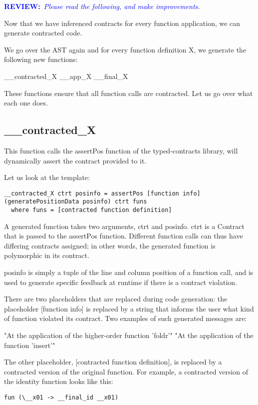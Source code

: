 \documentclass[10pt,a4paper]{article}
\newcommand{\annotate}[3]{
	\begin{scriptsize}
	\textcolor{#1}{\textbf{#2}~\textit{#3}}
	\end{scriptsize}\newline}
\newcommand{\review}{\annotate{blue} {REVIEW:} {Please read the following, and make improvements. \newline}}
\begin{document}
\review

Now that we have inferenced contracts for every function application, we can generate contracted code.

We go over the AST again and for every function definition X, we generate the following new functions:

\_\_contracted\_X
\_\_app\_X
\_\_final\_X

These functions ensure that all function calls are contracted. Let us go over what each one does.

\subsection{\_\_contracted\_X}
This function calls the assertPos function of the typed-contracts library, will dynamically assert the contract provided to it.


Let us look at the template:

\begin{lstlisting}
__contracted_X ctrt posinfo = assertPos [function info] (generatePositionData posinfo) ctrt funs
  where funs = [contracted function definition]
\end{lstlisting}

A generated function takes two arguments, ctrt and posinfo.
ctrt is a Contract that is passed to the assertPos function. 
Different function calls can thus have differing contracts assigned;
in other words, the generated function is polymorphic in its contract.

posinfo is simply a tuple of the line and column position of a function call, and is used to generate specific feedback at runtime if there is a contract violation.

There are two placeholders that are replaced during code generation:
the placeholder [function info] is replaced by a string that informs the user what kind of function violated its contract.
Two examples of such generated messages are:

"At the application of the higher-order function 'foldr'"
"At the application of the function 'insert'"

The other placeholder, [contracted function definition], is replaced by a contracted version of the original function.
For example, a contracted version of the identity function looks like this:

\begin{lstlisting}
fun (\__x01 -> __final_id __x01)
\end{lstlisting}
\end{document}
